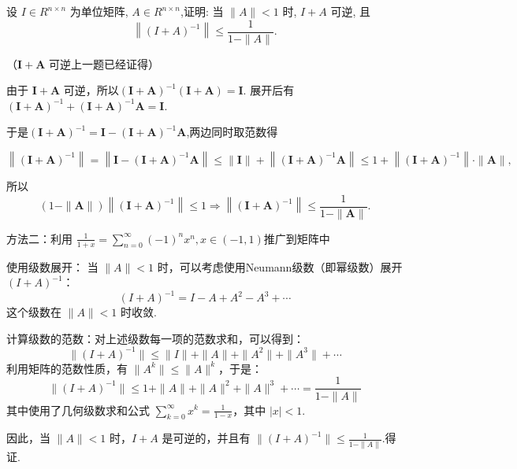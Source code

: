 \begin{tcolorbox}[enhanced,colback=10,colframe=9,breakable,coltitle=green!25!black,title=2024]
  
设 $ I \in R^{n \times n} $ 为单位矩阵, ${A} \in R^{n \times n} $,证明: 当 $ \|A\|<1 $ 时, $ I+A $ 可逆, 且
$$
\left\|(I+A)^{-1}\right\| \leq \frac{1}{1-\|A\|} .
$$
\tcblower

（$\boldsymbol{I}+\boldsymbol{A} $ 可逆上一题已经证得）

由于 $\boldsymbol{I}+\boldsymbol{A} $ 可逆，所以$(\boldsymbol{I}+\boldsymbol{A})^{-1}(\boldsymbol{I}+\boldsymbol{A})=\boldsymbol{I}$. 展开后有$(\boldsymbol{I}+\boldsymbol{A})^{-1}+(\boldsymbol{I}+\boldsymbol{A})^{-1} \boldsymbol{A}=\boldsymbol{I}$.

于是$(\boldsymbol{I}+\boldsymbol{A})^{-1}=\boldsymbol{I}-(\boldsymbol{I}+\boldsymbol{A})^{-1} \boldsymbol{A}$,两边同时取范数得

$$
\left\|(\boldsymbol{I}+\boldsymbol{A})^{-1}\right\|=\left\|\boldsymbol{I}-(\boldsymbol{I}+\boldsymbol{A})^{-1} \boldsymbol{A}\right\| \leqslant\|\boldsymbol{I}\|+\left\|(\boldsymbol{I}+\boldsymbol{A})^{-1} \boldsymbol{A}\right\|
\leqslant 1+\left\|(\boldsymbol{I}+\boldsymbol{A})^{-1}\right\| \cdot\|\boldsymbol{A}\|,
$$

所以
$$
(1-\|\boldsymbol{A}\|)\left\|(\boldsymbol{I}+\boldsymbol{A})^{-1}\right\| \leqslant 1 \Longrightarrow\left\|(\boldsymbol{I}+\boldsymbol{A})^{-1}\right\| \leqslant \frac{1}{1-\|\boldsymbol{A}\|} .
$$

方法二：利用 $\frac{1}{1+x}=\sum\limits_{n=0}^{\infty}(-1)^nx^n,x\in(-1,1)$推广到矩阵中

使用级数展开： 当 $\|A\| < 1$ 时，可以考虑使用Neumann级数（即幂级数）展开 $(I + A)^{-1}$：
   $$
   (I + A)^{-1} = I - A + A^2 - A^3 + \cdots
   $$
   这个级数在 $\|A\| < 1$ 时收敛.

计算级数的范数：对上述级数每一项的范数求和，可以得到：
   $$
   \|(I + A)^{-1}\| \leq \|I\| + \|A\| + \|A^2\| + \|A^3\| + \cdots
   $$
   利用矩阵的范数性质，有 $\|A^k\| \leq \|A\|^k$，于是：
   $$
   \|(I + A)^{-1}\| \leq 1 + \|A\| + \|A\|^2 + \|A\|^3 + \cdots = \frac{1}{1 - \|A\|}
   $$
其中使用了几何级数求和公式 $\sum\limits_{k=0}^\infty x^k = \frac{1}{1-x}$，其中 $|x| < 1$.

因此，当 $\|A\| < 1$ 时，$I + A$ 是可逆的，并且有 $\|(I+A)^{-1}\| \leq \frac{1}{1-\|A\|}$.得证.
\end{tcolorbox}

